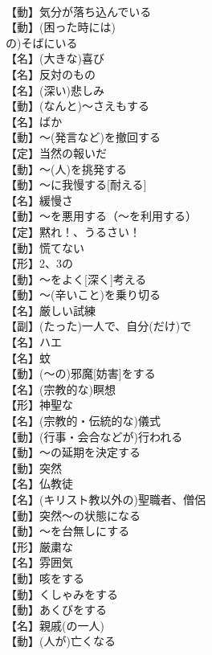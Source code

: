 \documentclass[8pt]{extreport}
\begin{document}
\begin{CJK}{UTF8}{min}
\\	【動】気分が落ち込んでいる
\\	【動】(困った時には)
\\	の)そばにいる
\\	【名】(大きな)喜び
\\	【名】反対のもの
\\	【名】(深い)悲しみ
\\	【動】(なんと)～さえもする
\\	【名】ばか
\\	【動】～(発言など)を撤回する
\\	【定】当然の報いだ
\\	【動】～(人)を挑発する
\\	【動】～に我慢する[耐える]
\\	【名】緩慢さ
\\	【動】～を悪用する（～を利用する）
\\	【定】黙れ！、うるさい！
\\	【動】慌てない
\\	【形】2、3の
\\	【動】～をよく[深く]考える
\\	【動】～(辛いこと)を乗り切る
\\	【名】厳しい試練
\\	【副】(たった)一人で、自分(だけ)で
\\	【名】ハエ
\\	【名】蚊
\\	【動】(～の)邪魔[妨害]をする
\\	【名】(宗教的な)瞑想
\\	【形】神聖な
\\	【名】(宗教的・伝統的な)儀式
\\	【動】(行事・会合などが)行われる
\\	【動】～の延期を決定する
\\	【動】突然
\\	【名】仏教徒
\\	【名】(キリスト教以外の)聖職者、僧侶
\\	【動】突然～の状態になる
\\	【動】～を台無しにする
\\	【形】厳粛な
\\	【名】雰囲気
\\	【動】咳をする
\\	【動】くしゃみをする
\\	【動】あくびをする
\\	【名】親戚(の一人)
\\	【動】(人が)亡くなる

\end{CJK}
\end{document}
